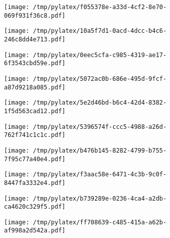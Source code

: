 \documentclass{article}
\begin{document}
\begin{figure}[htbp]
\begin{subfigure}[b]{.3\linewidth}
\texttt{[image: /tmp/pylatex/f055378e-a33d-4cf2-8e70-069f931f36c8.pdf]}
\end{subfigure}
\begin{subfigure}[b]{.3\linewidth}
\texttt{[image: /tmp/pylatex/10a5f7d1-0acd-4dcc-b4c6-246c8dd4e713.pdf]}
\end{subfigure}
\begin{subfigure}[b]{.3\linewidth}
\texttt{[image: /tmp/pylatex/0eec5cfa-c985-4319-ae17-6f3543cbd59e.pdf]}
\end{subfigure}
\begin{subfigure}[b]{.3\linewidth}
\texttt{[image: /tmp/pylatex/5072ac0b-686e-495d-9fcf-a87d9218a085.pdf]}
\end{subfigure}
\begin{subfigure}[b]{.3\linewidth}
\texttt{[image: /tmp/pylatex/5e2d46bd-b6c4-42d4-8382-1f5d563cad12.pdf]}
\end{subfigure}
\begin{subfigure}[b]{.3\linewidth}
\texttt{[image: /tmp/pylatex/5396574f-ccc5-4988-a26d-762f741c1c1c.pdf]}
\end{subfigure}
\begin{subfigure}[b]{.3\linewidth}
\texttt{[image: /tmp/pylatex/b476b145-8282-4799-b755-7f95c77a40e4.pdf]}
\end{subfigure}
\begin{subfigure}[b]{.3\linewidth}
\texttt{[image: /tmp/pylatex/f3aac58e-6471-4c3b-9c0f-8447fa3332e4.pdf]}
\end{subfigure}
\begin{subfigure}[b]{.3\linewidth}
\texttt{[image: /tmp/pylatex/b739289e-0236-4ca4-a2db-ca4620c329f5.pdf]}
\end{subfigure}
\begin{subfigure}[b]{.3\linewidth}
\texttt{[image: /tmp/pylatex/ff708639-c485-415a-a62b-af998a2d542a.pdf]}
\end{subfigure}
\end{figure}
\end{document}
